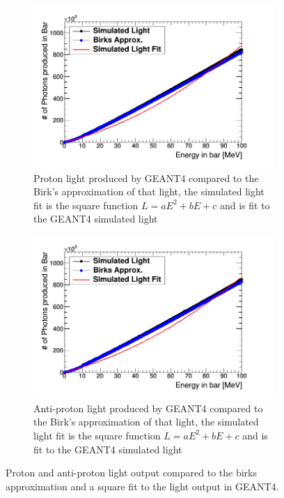 \begin{figure}[!h]
\centering
\begin{subfigure}{.5\textwidth}
  \centering
  \includegraphics[width=\linewidth]{light_of_protons0-100mev.png}
  \captionsetup{width=.9\linewidth}
  \caption{Proton light produced by GEANT4 compared to the Birk's approximation of that light, the simulated light fit is the square function $L = aE^2 + bE+ c$ and is fit to the GEANT4 simulated light}
  \label{subFig:proton_light}
\end{subfigure}%
\begin{subfigure}{.5\textwidth}
  \centering
  \includegraphics[width=\linewidth]{light_of_Aprotons0-100mev.png}
  \captionsetup{width=.9\linewidth}
  \caption{Anti-proton light produced by GEANT4 compared to the Birk's approximation of that light, the simulated light fit is the square function $L = aE^2 + bE+ c$ and is fit to the GEANT4 simulated light}
  \label{subFig:aproton_light}
\end{subfigure}
\caption{Proton and anti-proton light output compared to the birks approximation and a square fit to the light output in GEANT4.}
\label{fig:proton_aproton_light}
\end{figure}

